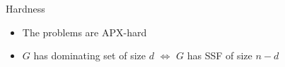 \begin{frame}[<+>]{Hardness}
\begin{itemize}
  \item The problems are APX-hard
  \item $G$ has dominating set of size $d$ $\iff$ $G$ has SSF of size $n-d$
\end{itemize}
\end{frame}